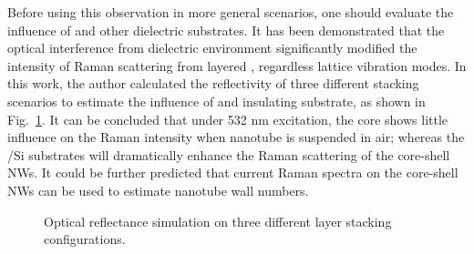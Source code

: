 Before using this observation in more general scenarios, one should evaluate the influence of  and other dielectric substrates. It has been demonstrated that the optical interference from dielectric environment significantly modified the intensity of Raman scattering from layered , regardless lattice vibration modes.\cite{Li2012} In this work, the author calculated the reflectivity of three different stacking scenarios to estimate the influence of  and insulating substrate, as shown in Fig.~\ref{fig:ch5ws2stk}. It can be concluded that under 532 nm excitation, the  core shows little influence on the Raman intensity when  nanotube is suspended in air; whereas the /Si substrates will dramatically enhance the Raman scattering of the core-shell NWs. It could be further predicted that current Raman spectra on the core-shell NWs can be used to estimate  nanotube wall numbers. 

\begin{figure}[htb]
\centering
{}\hspace{0.03\textwidth}
\hspace{0.03\textwidth}
\caption[Optical reflectance simulation on three different  layer stacking configurations]{Optical reflectance simulation on three different  layer stacking configurations.}
\label{fig:ch5ws2stk}
\end{figure}

